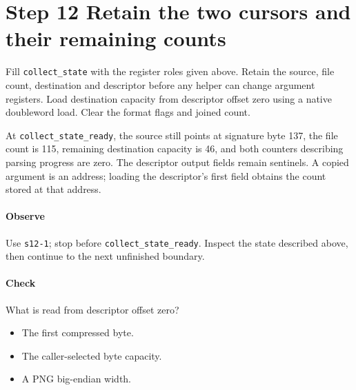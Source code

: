 \section{Step 12 Retain the two cursors and their remaining counts}\label{png-collect-s12}
Fill \texttt{collect\_state} with the register roles given above. Retain the source, file count, destination and descriptor before any helper can change argument registers. Load destination capacity from descriptor offset zero using a native doubleword load. Clear the format flags and joined count.

At \texttt{collect\_state\_ready}, the source still points at signature byte 137, the file count is 115, remaining destination capacity is 46, and both counters describing parsing progress are zero. The descriptor output fields remain sentinels. A copied argument is an address; loading the descriptor's first field obtains the count stored at that address.

\paragraph{Observe} Use \texttt{s12-1}; stop before \texttt{collect\_state\_ready}. Inspect the state described above, then continue to the next unfinished boundary.

\paragraph{Check} What is read from descriptor offset zero?
\begin{itemize}
  \item[A.] The first compressed byte.
  \item[B.] The caller-selected byte capacity.
  \item[C.] A PNG big-endian width.
\end{itemize}
